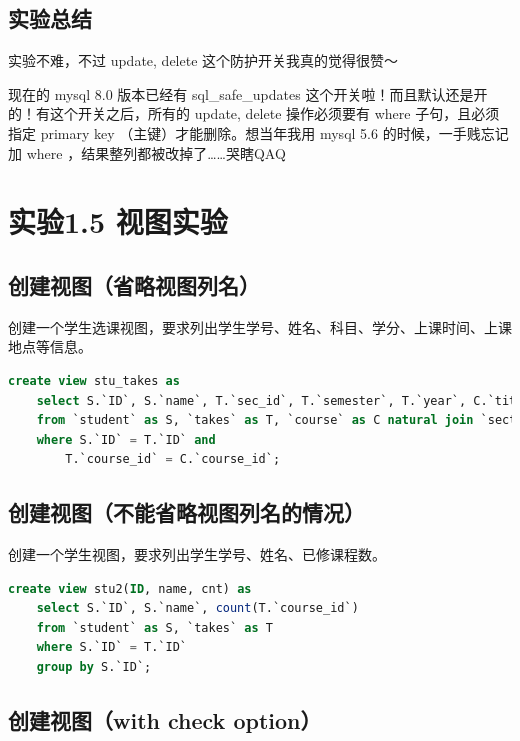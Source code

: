\documentclass{article}
\begin{document}
\subsection{实验总结}

实验不难，不过 update, delete 这个防护开关我真的觉得很赞～

现在的 mysql 8.0 版本已经有 sql\_safe\_updates 这个开关啦！而且默认还是开的！有这个开关之后，所有的 update, delete 操作必须要有 where 子句，且必须指定 primary key （主键）才能删除。想当年我用 mysql 5.6 的时候，一手贱忘记加 where ，结果整列都被改掉了……哭瞎QAQ

\section{实验1.5 视图实验}

\subsection{创建视图（省略视图列名）}

创建一个学生选课视图，要求列出学生学号、姓名、科目、学分、上课时间、上课地点等信息。

\begin{lstlisting}[language=sql]
create view stu_takes as
	select S.`ID`, S.`name`, T.`sec_id`, T.`semester`, T.`year`, C.`title`, C.`credits`, SE.`building`, SE.`room_number`, SE.`time_slot_id`
	from `student` as S, `takes` as T, `course` as C natural join `section` as SE
	where S.`ID` = T.`ID` and
		T.`course_id` = C.`course_id`;
\end{lstlisting}

\subsection{创建视图（不能省略视图列名的情况）}

创建一个学生视图，要求列出学生学号、姓名、已修课程数。

\begin{lstlisting}[language=sql]
create view stu2(ID, name, cnt) as
	select S.`ID`, S.`name`, count(T.`course_id`)
    from `student` as S, `takes` as T
    where S.`ID` = T.`ID`
    group by S.`ID`;
\end{lstlisting}

\subsection{创建视图（with check option）}
\end{document}
